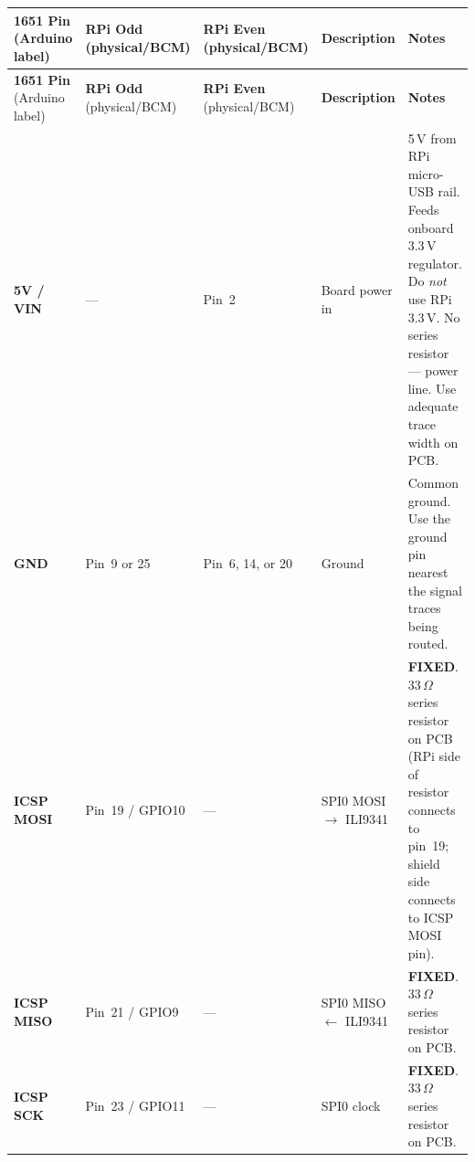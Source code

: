\documentclass[11pt,a4paper]{article}
\newcommand{\fixed}{\textbf{FIXED}}
\newcommand{\na}{---}
\begin{document}
\begin{longtable}{C{1.5cm} C{1.4cm} C{1.4cm} L{2.8cm} L{6.5cm}}
  \toprule
  \color{white}\textbf{1651 Pin} \newline \color{white}\footnotesize(Arduino label) &
  \color{white}\textbf{RPi Odd} \newline \color{white}\footnotesize(physical/BCM) &
  \color{white}\textbf{RPi Even} \newline \color{white}\footnotesize(physical/BCM) &
  \color{white}\textbf{Description} &
  \color{white}\textbf{Notes} \\
  \midrule
  \endfirsthead
  \toprule
  \color{white}\textbf{1651 Pin} \newline \color{white}\footnotesize(Arduino label) &
  \color{white}\textbf{RPi Odd} \newline \color{white}\footnotesize(physical/BCM) &
  \color{white}\textbf{RPi Even} \newline \color{white}\footnotesize(physical/BCM) &
  \color{white}\textbf{Description} &
  \color{white}\textbf{Notes} \\
  \midrule
  \endhead
  \bottomrule
  \endfoot

  \textbf{5V / VIN} &
  \na &
  Pin~2 &
  Board power in &
  5\,V from RPi micro-USB rail. Feeds onboard 3.3\,V regulator.
  Do \emph{not} use RPi 3.3\,V.
  No series resistor --- power line. Use adequate trace width on PCB. \\

  \textbf{GND} &
  Pin~9 or 25 &
  Pin~6, 14, or 20 &
  Ground &
  Common ground. Use the ground pin nearest the signal traces being routed. \\

  \textbf{ICSP MOSI} &
  Pin~19 / GPIO10 &
  \na &
  SPI0 MOSI $\to$ ILI9341 &
  \fixed. 33\,$\Omega$ series resistor on PCB (RPi side of resistor connects to pin~19;
  shield side connects to ICSP MOSI pin). \\

  \textbf{ICSP MISO} &
  Pin~21 / GPIO9 &
  \na &
  SPI0 MISO $\leftarrow$ ILI9341 &
  \fixed. 33\,$\Omega$ series resistor on PCB. \\

  \textbf{ICSP SCK} &
  Pin~23 / GPIO11 &
  \na &
  SPI0 clock &
  \fixed. 33\,$\Omega$ series resistor on PCB. \\


\end{longtable}
\end{document}
